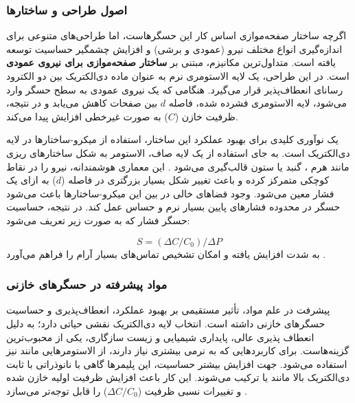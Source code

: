 \subsubsection{اصول طراحی و ساختارها}

اگرچه ساختار صفحه‌موازی اساس کار این حسگرهاست، اما طراحی‌های متنوعی برای اندازه‌گیری انواع مختلف نیرو (عمودی و برشی) و افزایش چشمگیر حساسیت توسعه یافته است. متداول‌ترین مکانیزم، مبتنی بر \textbf{ساختار صفحه‌موازی برای نیروی عمودی} است. در این طراحی، یک لایه الاستومری نرم به عنوان ماده دی‌الکتریک بین دو الکترود رسانای انعطاف‌پذیر قرار می‌گیرد. هنگامی که یک نیروی عمودی به سطح حسگر وارد می‌شود، لایه الاستومری فشرده شده، فاصله $d$ بین صفحات کاهش می‌یابد و در نتیجه، ظرفیت خازن ($C$) به صورت غیرخطی افزایش پیدا می‌کند.

یک نوآوری کلیدی برای بهبود عملکرد این ساختار، استفاده از میکرو-ساختارها
 در لایه دی‌الکتریک است. به جای استفاده از یک لایه صاف، الاستومر به شکل ساختارهای ریزی مانند هرم
،
 گنبد 
  یا ستون
   قالب‌گیری می‌شود \cite{mannsfeld2010highly}. این معماری هوشمندانه، نیرو را در نقاط کوچکی متمرکز کرده و باعث تغییر شکل بسیار بزرگتری در فاصله ($d$) به ازای یک فشار معین می‌شود. وجود فضاهای خالی در بین این میکرو-ساختارها باعث می‌شود حسگر در محدوده فشارهای پایین بسیار نرم و حساس عمل کند. در نتیجه، حساسیت حسگر فشار که به صورت زیر تعریف می‌شود:
  
  \begin{equation}
  	S = (\Delta C/C_0)/\Delta P
  	\label{eq:sensC}
  \end{equation}
     به شدت افزایش یافته و امکان تشخیص تماس‌های بسیار آرام را فراهم می‌آورد \cite{zou2017novel}.



\subsubsection{مواد پیشرفته در حسگرهای خازنی}
پیشرفت در علم مواد، تأثیر مستقیمی بر بهبود عملکرد، انعطاف‌پذیری و حساسیت حسگرهای خازنی داشته است. انتخاب لایه دی‌الکتریک نقشی حیاتی دارد؛ 
 به دلیل انعطاف ‌پذیری عالی، پایداری شیمیایی و زیست ‌سازگاری، یکی از محبوب‌ترین گزینه‌هاست. برای کاربردهایی که به نرمی بیشتری نیاز دارند، از الاستومرهایی مانند
   نیز استفاده می‌شود. جهت افزایش بیشتر حساسیت، این پلیمرها گاهی با نانوذراتی با ثابت دی‌الکتریک بالا
  مانند
   
    یا 
       
     ترکیب می‌شوند. این کار باعث افزایش ظرفیت اولیه خازن شده و تغییرات نسبی ظرفیت ($\Delta C/C_0$) را قابل توجه‌تر می‌سازد \cite{zou2017novel}.
     
